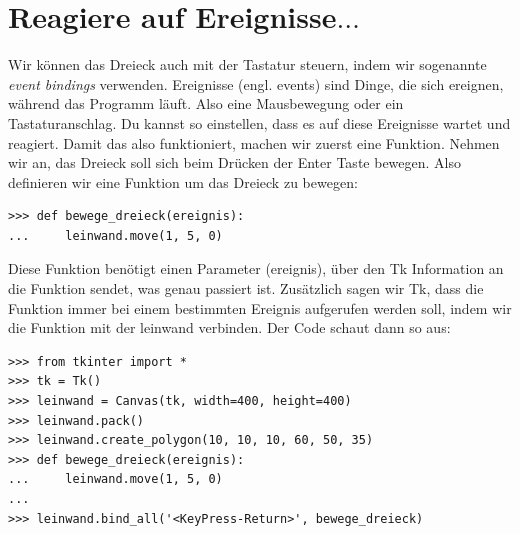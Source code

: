 \section{Reagiere auf Ereignisse$\ldots$}

Wir können das Dreieck auch mit der Tastatur steuern, indem wir sogenannte \emph{event bindings} verwenden. Ereignisse (engl. events) sind Dinge, die sich ereignen, während das Programm läuft. Also eine Mausbewegung oder ein Tastaturanschlag. Du kannst  so einstellen, dass es auf diese Ereignisse wartet und reagiert. Damit das also funktioniert, machen wir zuerst eine Funktion. Nehmen wir an, das Dreieck soll sich beim Drücken der Enter Taste bewegen. Also definieren wir eine Funktion um das Dreieck zu bewegen:

\begin{Verbatim}[frame=single]
>>> def bewege_dreieck(ereignis):
...     leinwand.move(1, 5, 0)
\end{Verbatim}

Diese Funktion benötigt einen Parameter (ereignis), über den Tk Information an die Funktion sendet, was genau passiert ist. Zusätzlich sagen wir Tk, dass die Funktion immer bei einem bestimmten Ereignis aufgerufen werden soll, indem wir die  Funktion mit der leinwand verbinden. Der Code schaut dann so aus:

\begin{Verbatim}[frame=single]
>>> from tkinter import *
>>> tk = Tk()
>>> leinwand = Canvas(tk, width=400, height=400)
>>> leinwand.pack()
>>> leinwand.create_polygon(10, 10, 10, 60, 50, 35)
>>> def bewege_dreieck(ereignis):
...     leinwand.move(1, 5, 0)
...
>>> leinwand.bind_all('<KeyPress-Return>', bewege_dreieck)
\end{Verbatim}

